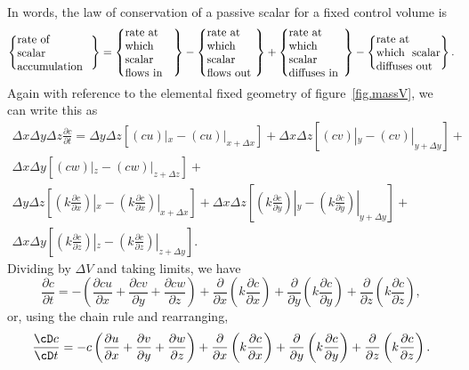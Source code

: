 \documentclass[a4paper,11pt]		{report}
\begin{document}
In words, the law of conservation of a passive
scalar for a fixed control volume is
\begin{equation}
\left\{ \parbox{23mm}{rate of\\ scalar\\ accumulation} \right\}=
\left\{ \parbox{15mm}{rate at\\ which scalar flows in} \right\}-
\left\{ \parbox{15mm}{rate at\\ which scalar flows out} \right\}+
\left\{ \parbox{17mm}{rate at\\ which scalar diffuses in} \right\}-
\left\{ \parbox{20mm}{rate at\\ which scalar diffuses out} \right\}.
\label{eq.scalar_bal_words}
\end{equation}
Again with reference to the elemental fixed geometry of
figure~\ref{fig.massV}, we can write this as
\begin{multline}
\Delta x\Delta y\Delta z\frac{\partial c}{\partial t}=
\Delta y\Delta z\left[(c u)|_{x}-(c u)|_{x+\Delta x}\right]+
\Delta x\Delta z\left[(c v)|_{y}-(c v)|_{y+\Delta y}\right]+\\
\Delta x\Delta y\left[(c w)|_{z}-(c w)|_{z+\Delta z}\right]+\\
\Delta y\Delta z\left[(k \frac{\partial c}{\partial x})|_{x}-(k
  \frac{\partial c}{\partial x})|_{x+\Delta x}\right]+
\Delta x\Delta z\left[(k \frac{\partial c}{\partial y})|_{y}-(k
  \frac{\partial c}{\partial y})|_{y+\Delta y}\right]+\\
\Delta x\Delta y\left[(k \frac{\partial c}{\partial z})|_{z}-(k
  \frac{\partial c}{\partial z})|_{z+\Delta y}\right].
\end{multline}
Dividing by $\Delta V$ and taking limits, we have
\begin{equation}
\frac{\partial c}{\partial t}=
-\left(\frac{\partial cu}{\partial x}+\frac{\partial cv}{\partial
  y}+\frac{\partial cw}{\partial z}\right) + \frac{\partial}{\partial
  x}\left(k\frac{\partial c}{\partial x}\right)+ \frac{\partial}{\partial
  y}\left(k\frac{\partial c}{\partial y}\right)+ \frac{\partial}{\partial
  z}\left(k\frac{\partial c}{\partial z}\right),
\end{equation}
or, using the chain rule and rearranging,
\begin{equation}
\frac{\cD c}{\cD t}=
-c\left(\frac{\partial u}{\partial x}+\frac{\partial v}{\partial
  y}+\frac{\partial w}{\partial z}\right) + \frac{\partial}{\partial
  x}\left(k\frac{\partial c}{\partial x}\right)+ \frac{\partial}{\partial
  y}\left(k\frac{\partial c}{\partial y}\right)+ \frac{\partial}{\partial
  z}\left(k\frac{\partial c}{\partial z}\right).
\end{equation}
\end{document}
